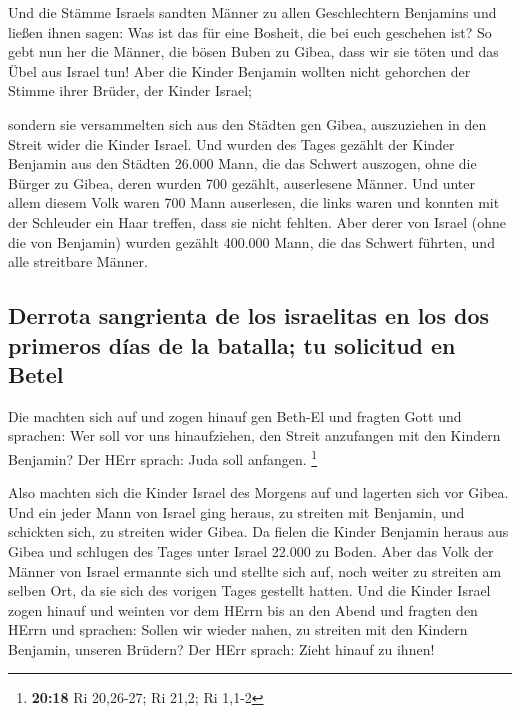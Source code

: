  Und die Stämme Israels sandten Männer zu allen
Geschlechtern Benjamins und ließen ihnen sagen: Was ist das für eine
Bosheit, die bei euch geschehen ist?  So gebt nun her die
Männer, die bösen Buben zu Gibea, dass wir sie töten und das Übel aus
Israel tun! Aber die Kinder Benjamin wollten nicht gehorchen der Stimme
ihrer Brüder, der Kinder Israel;

 sondern sie versammelten sich aus den Städten gen Gibea,
auszuziehen in den Streit wider die Kinder Israel.  Und
wurden des Tages gezählt der Kinder Benjamin aus den Städten 26.000
Mann, die das Schwert auszogen, ohne die Bürger zu Gibea, deren wurden
700 gezählt, auserlesene Männer.  Und unter allem diesem
Volk waren 700 Mann auserlesen, die links waren und konnten mit der
Schleuder ein Haar treffen, dass sie nicht fehlten.  Aber
derer von Israel (ohne die von Benjamin) wurden gezählt 400.000 Mann,
die das Schwert führten, und alle streitbare Männer.

\hypertarget{derrota-sangrienta-de-los-israelitas-en-los-dos-primeros-duxedas-de-la-batalla-tu-solicitud-en-betel}{%
\subsection{Derrota sangrienta de los israelitas en los dos primeros
días de la batalla; tu solicitud en
Betel}\label{derrota-sangrienta-de-los-israelitas-en-los-dos-primeros-duxedas-de-la-batalla-tu-solicitud-en-betel}}

 Die machten sich auf und zogen hinauf gen Beth-El und
fragten Gott und sprachen: Wer soll vor uns hinaufziehen, den Streit
anzufangen mit den Kindern Benjamin? Der HErr sprach: Juda soll
anfangen. \footnote{\textbf{20:18} Ri 20,26-27; Ri 21,2; Ri 1,1-2}

 Also machten sich die Kinder Israel des Morgens auf und
lagerten sich vor Gibea.  Und ein jeder Mann von Israel
ging heraus, zu streiten mit Benjamin, und schickten sich, zu streiten
wider Gibea.  Da fielen die Kinder Benjamin heraus aus
Gibea und schlugen des Tages unter Israel 22.000 zu Boden.
 Aber das Volk der Männer von Israel ermannte sich und
stellte sich auf, noch weiter zu streiten am selben Ort, da sie sich des
vorigen Tages gestellt hatten.  Und die Kinder Israel
zogen hinauf und weinten vor dem HErrn bis an den Abend und fragten den
HErrn und sprachen: Sollen wir wieder nahen, zu streiten mit den Kindern
Benjamin, unseren Brüdern? Der HErr sprach: Zieht hinauf zu ihnen!

